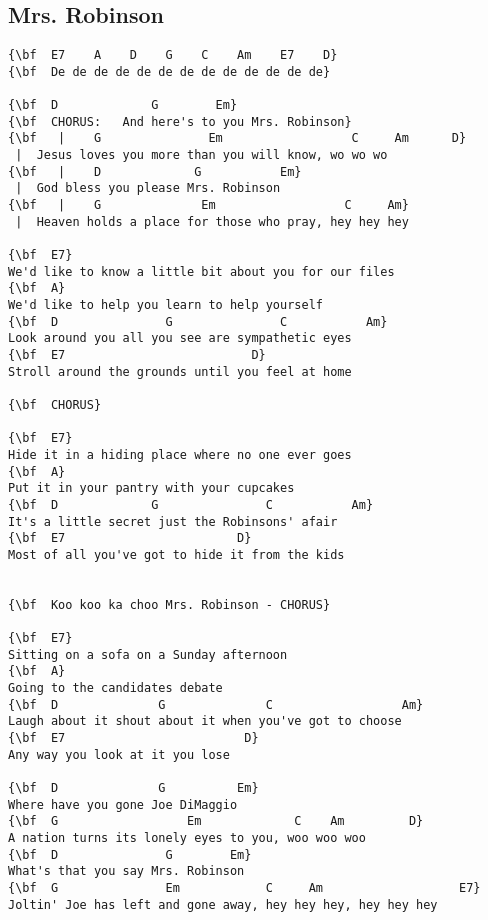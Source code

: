 \documentclass[a4paper]{article}
\begin{document}
\subsection{Mrs. Robinson}
\begin{Verbatim}[commandchars=\\\{\}]
{\bf  E7    A    D    G    C    Am    E7    D}
{\bf  De de de de de de de de de de de de de}

{\bf  D             G        Em}
{\bf  CHORUS:	And here's to you Mrs. Robinson}
{\bf   |	G               Em                  C     Am      D}
 |	Jesus loves you more than you will know, wo wo wo
{\bf   |	D             G           Em}
 |	God bless you please Mrs. Robinson
{\bf   |	G              Em                  C     Am}
 |	Heaven holds a place for those who pray, hey hey hey

{\bf  E7}
We'd like to know a little bit about you for our files
{\bf  A}
We'd like to help you learn to help yourself
{\bf  D               G               C           Am}
Look around you all you see are sympathetic eyes
{\bf  E7                          D}
Stroll around the grounds until you feel at home

{\bf  CHORUS}

{\bf  E7}
Hide it in a hiding place where no one ever goes
{\bf  A}
Put it in your pantry with your cupcakes
{\bf  D             G               C           Am}
It's a little secret just the Robinsons' afair
{\bf  E7                        D}
Most of all you've got to hide it from the kids


{\bf  Koo koo ka choo Mrs. Robinson - CHORUS}

{\bf  E7}
Sitting on a sofa on a Sunday afternoon
{\bf  A}
Going to the candidates debate
{\bf  D              G              C                  Am}
Laugh about it shout about it when you've got to choose
{\bf  E7                         D}
Any way you look at it you lose

{\bf  D              G          Em}
Where have you gone Joe DiMaggio
{\bf  G                  Em             C    Am         D}
A nation turns its lonely eyes to you, woo woo woo
{\bf  D               G        Em}
What's that you say Mrs. Robinson
{\bf  G               Em            C     Am                   E7}
Joltin' Joe has left and gone away, hey hey hey, hey hey hey

\end{Verbatim}
\newpage
\end{document}
